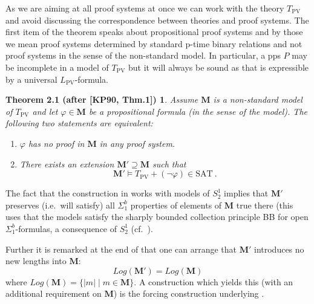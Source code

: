 \documentclass[11pt]{article}
\newcommand{\LPV}{L_{\mathrm{PV}}}
\newcommand{\TPV}{T_{\mathrm{PV}}}
\newcommand{\SAT}{\mathrm{SAT}}
\newcommand{\Log}{\mathit{Log}}
\newtheorem*{sourcetheoremtwoone}{Theorem 2.1 (after [KP90, Thm.1])}
\begin{document}
As we are aiming at all proof systems at once we can work with the theory $\TPV$ and avoid discussing the correspondence between theories and proof systems. The first item of the theorem speaks about propositional proof systems and by those we mean proof systems determined by standard p-time binary relations and not proof systems in the sense of the non-standard model. In particular, a pps $P$ may be incomplete in a model of $\TPV$ but it will always be sound as that is expressible by a universal $\LPV$-formula.
\begin{sourcetheoremtwoone}
Assume $\mathbf{M}$ is a non-standard model of $\TPV$ and let $\varphi\in \mathbf{M}$ be a propositional formula (in the sense of the model). The following two statements are equivalent:
\begin{enumerate}[label=(\arabic*)]
\item $\varphi$ has no proof in $\mathbf{M}$ in any proof system.
\item There exists an extension $\mathbf{M}'\supseteq \mathbf{M}$ such that
\[
\mathbf{M}'\models\TPV+(\neg\varphi)\in\SAT\ .
\]
\end{enumerate}
\end{sourcetheoremtwoone}
The fact that the construction in \cite{KP90} works with models of $S^1_2$ implies that $\mathbf{M}'$ preserves (i.e.\ will satisfy) all $\Sigma^b_1$ properties of elements of $\mathbf{M}$ true there (this uses that the models satisfy the sharply bounded collection principle BB for open $\Sigma^b_1$-formulas, a consequence of $S^1_2$ (cf.\ \cite{Bus86,Kra95}).

Further it is remarked at the end of \cite{KP90} that one can arrange that $\mathbf{M}'$ introduces no new lengths into $\mathbf{M}$:
\begin{equation}
\Log(\mathbf{M}')=\Log(\mathbf{M})
\tag{2.1}\label{eq:21}
\end{equation}
where $\Log(\mathbf{M})=\{|m|\mid m\in \mathbf{M}\}$. A construction which yields this (with an additional requirement on $\mathbf{M}$) is the forcing construction underlying \cite[Thm.9.4.2]{Kra95}.
\end{document}
